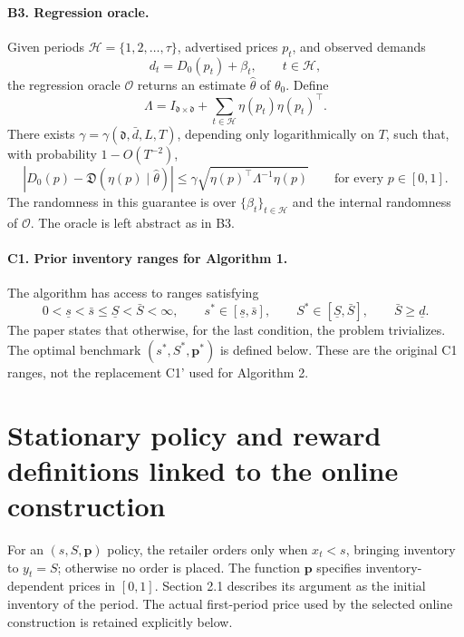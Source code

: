 \documentclass[11pt]{article}
\begin{document}
\paragraph{B3. Regression oracle.}
Given periods \(\mathcal H=\{1,2,\ldots,\tau\}\), advertised prices \(p_t\), and observed demands
\[
d_t=D_0(p_t)+\beta_t,\qquad t\in\mathcal H,
\]
the regression oracle \(\mathcal O\) returns an estimate \(\widehat\theta\) of \(\theta_0\). Define
\[
\Lambda=I_{\mathfrak d\times\mathfrak d}
+\sum_{t\in\mathcal H}\eta(p_t)\eta(p_t)^\top.
\]
There exists \(\gamma=\gamma(\mathfrak d,\bar d,L,T)\), depending only logarithmically on \(T\), such that, with probability \(1-O(T^{-2})\),
\begin{equation}
\left|D_0(p)-\mathfrak D(\eta(p)\mid\widehat\theta)\right|
\leq\gamma\sqrt{\eta(p)^\top\Lambda^{-1}\eta(p)}
\qquad\text{for every }p\in[0,1].
\tag{8}
\end{equation}
The randomness in this guarantee is over \(\{\beta_t\}_{t\in\mathcal H}\) and the internal randomness of \(\mathcal O\). The oracle is left abstract as in B3.

\paragraph{C1. Prior inventory ranges for Algorithm 1.}
The algorithm has access to ranges satisfying
\[
0<\underline s<\bar s\leq\underline S<\bar S<\infty,
\qquad
s^*\in[\underline s,\bar s],\qquad
S^*\in[\underline S,\bar S],\qquad
\bar S\geq\underline d.
\]
The paper states that otherwise, for the last condition, the problem trivializes. The optimal benchmark \((s^*,S^*,\boldsymbol p^*)\) is defined below. These are the original C1 ranges, not the replacement C1' used for Algorithm 2.

\section*{Stationary policy and reward definitions linked to the online construction}
For an \((s,S,\boldsymbol p)\) policy, the retailer orders only when \(x_t<s\), bringing inventory to \(y_t=S\); otherwise no order is placed. The function \(\boldsymbol p\) specifies inventory-dependent prices in \([0,1]\). Section 2.1 describes its argument as the initial inventory of the period. The actual first-period price used by the selected online construction is retained explicitly below.
\end{document}

